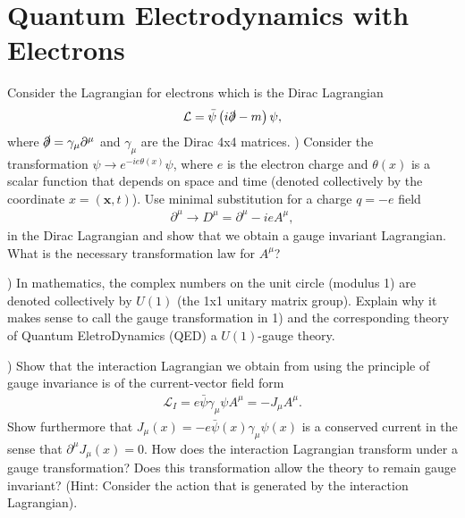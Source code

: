 \documentclass[working, oneside]{../../../Preambles/tuftebook}
\begin{document}
\section{Quantum Electrodynamics with Electrons}
\noindent Consider the Lagrangian for electrons which is the Dirac Lagrangian
\begin{align}
\mathcal{L}=\bar{\psi}\left(i\slashed\partial-m\right)\psi,
\end{align}
where $\slashed\partial=\gamma_\mu \partial^\mu$ and $\gamma_\mu$ are the Dirac 4x4 matrices.
\vspace{1em}
) Consider the transformation $\psi\to e^{-ie\theta(x)}\psi$, where $e$ is the 
electron charge and $\theta(x)$ is a scalar function that depends on space and time (denoted 
collectively by the coordinate $x=(\bm x,t)$). Use minimal substitution for a charge $q=-e$
field
\begin{align}
\partial^\mu\to D^\mu=\partial^\mu-ieA^\mu,
\end{align}
in the Dirac Lagrangian and show that we obtain a gauge invariant Lagrangian. What is 
the necessary transformation law for $A^\mu$? 

\vspace{1em}
) In mathematics, the complex numbers on the unit circle (modulus 1) are 
denoted collectively by $U(1)$ (the 1x1 unitary matrix group). Explain why it
makes sense to call the gauge transformation in 1) and the corresponding theory
of Quantum EletroDynamics (QED) a $U(1)$-gauge theory.


\vspace{1em}
) Show that the interaction Lagrangian we obtain from using the principle
of gauge invariance is of the current-vector field form
\begin{align}\label{QEDint}
\mathcal{L}_I=e\bar{\psi}\gamma_\mu\psi A^\mu=-J_\mu A^\mu.
\end{align}
Show furthermore that $J_\mu(x)=-e\bar{\psi}(x)\gamma_\mu\psi(x)$ is a conserved current in the 
sense that $\partial^\mu J_\mu(x)=0$. How does the interaction Lagrangian transform under a 
gauge transformation? Does this transformation allow the theory to remain gauge invariant?
(Hint: Consider the action that is generated by the interaction Lagrangian).
\end{document}
